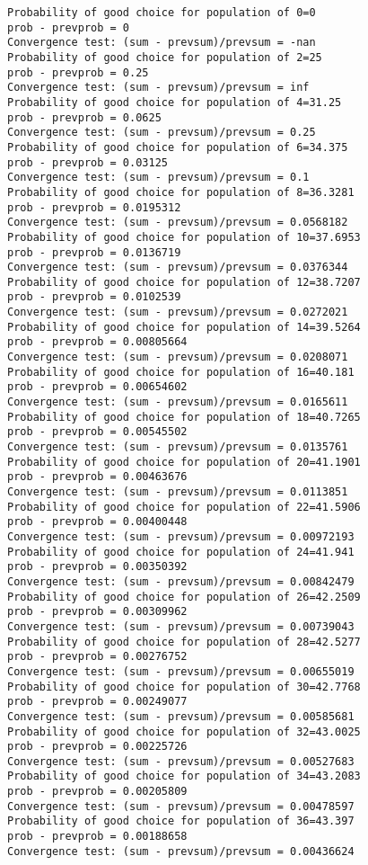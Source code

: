 \documentclass[11pt,onecolumn]{article}
\begin{document}
\begin{verbatim}
Probability of good choice for population of 0=0
prob - prevprob = 0
Convergence test: (sum - prevsum)/prevsum = -nan
Probability of good choice for population of 2=25
prob - prevprob = 0.25
Convergence test: (sum - prevsum)/prevsum = inf
Probability of good choice for population of 4=31.25
prob - prevprob = 0.0625
Convergence test: (sum - prevsum)/prevsum = 0.25
Probability of good choice for population of 6=34.375
prob - prevprob = 0.03125
Convergence test: (sum - prevsum)/prevsum = 0.1
Probability of good choice for population of 8=36.3281
prob - prevprob = 0.0195312
Convergence test: (sum - prevsum)/prevsum = 0.0568182
Probability of good choice for population of 10=37.6953
prob - prevprob = 0.0136719
Convergence test: (sum - prevsum)/prevsum = 0.0376344
Probability of good choice for population of 12=38.7207
prob - prevprob = 0.0102539
Convergence test: (sum - prevsum)/prevsum = 0.0272021
Probability of good choice for population of 14=39.5264
prob - prevprob = 0.00805664
Convergence test: (sum - prevsum)/prevsum = 0.0208071
Probability of good choice for population of 16=40.181
prob - prevprob = 0.00654602
Convergence test: (sum - prevsum)/prevsum = 0.0165611
Probability of good choice for population of 18=40.7265
prob - prevprob = 0.00545502
Convergence test: (sum - prevsum)/prevsum = 0.0135761
Probability of good choice for population of 20=41.1901
prob - prevprob = 0.00463676
Convergence test: (sum - prevsum)/prevsum = 0.0113851
Probability of good choice for population of 22=41.5906
prob - prevprob = 0.00400448
Convergence test: (sum - prevsum)/prevsum = 0.00972193
Probability of good choice for population of 24=41.941
prob - prevprob = 0.00350392
Convergence test: (sum - prevsum)/prevsum = 0.00842479
Probability of good choice for population of 26=42.2509
prob - prevprob = 0.00309962
Convergence test: (sum - prevsum)/prevsum = 0.00739043
Probability of good choice for population of 28=42.5277
prob - prevprob = 0.00276752
Convergence test: (sum - prevsum)/prevsum = 0.00655019
Probability of good choice for population of 30=42.7768
prob - prevprob = 0.00249077
Convergence test: (sum - prevsum)/prevsum = 0.00585681
Probability of good choice for population of 32=43.0025
prob - prevprob = 0.00225726
Convergence test: (sum - prevsum)/prevsum = 0.00527683
Probability of good choice for population of 34=43.2083
prob - prevprob = 0.00205809
Convergence test: (sum - prevsum)/prevsum = 0.00478597
Probability of good choice for population of 36=43.397
prob - prevprob = 0.00188658
Convergence test: (sum - prevsum)/prevsum = 0.00436624

\end{verbatim}
\end{document}
